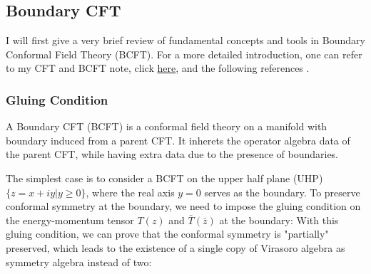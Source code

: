 \subsection{Boundary CFT} 

I will first give a very brief review of fundamental concepts and tools in Boundary Conformal Field Theory (BCFT). For a more detailed introduction, one can refer to my CFT and BCFT note, click \href{https://xiao-daihua.github.io/note.html}{here}, and the following references \cite{cardyBoundaryConditionsFusion1989, northeYoungResearchersSchool2025, recknagelBoundaryConformalField}.

\subsubsection{Gluing Condition}

A Boundary CFT (BCFT) is a conformal field theory on a manifold with boundary induced from a parent CFT. It inherets the operator algebra data of the parent CFT, while having extra data due to the presence of boundaries. 

The simplest case is to consider a BCFT on the upper half plane (UHP) $\{z=x+iy|y\geq 0\}$, where the real axis $y=0$ serves as the boundary. 
To preserve conformal symmetry at the boundary, we need to impose the gluing condition on the energy-momentum tensor $T(z)$ and $\bar{T}(\bar{z})$ at the boundary:
With this gluing condition, we can prove that the conformal symmetry is "partially" preserved, which leads to the existence of a single copy of Virasoro algebra as symmetry algebra instead of two:

